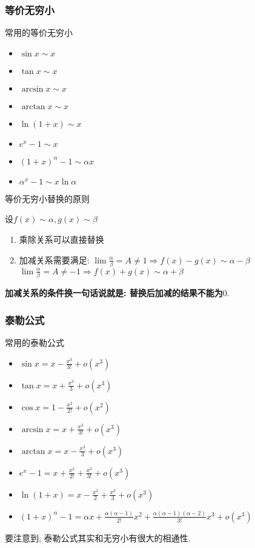 \subsubsection{等价无穷小}
{\kaishu 常用的等价无穷小}\vspace{-1em}
\begin{multicols}{2}
    \begin{itemize}
        \item $ \sin x\sim x $
        \item $ \tan x\sim x $
        \item $ \arcsin x\sim x $
        \item $ \arctan x\sim x $
        \item $ \ln(1+x)\sim x $
        \item $ e^{x}-1\sim x $
        \item $ (1+x)^{\alpha}-1\sim \alpha x $
        \item $ \alpha^{x}-1\sim x\ln \alpha $
    \end{itemize}
\end{multicols}
{\kaishu 等价无穷小替换的原则}\par \vspace{.5em}
设$ f(x)\sim \alpha, g(x)\sim \beta $
\begin{enumerate}
    \item 乘除关系可以直接替换
    \item 加减关系需要满足:
          \subitem $ \lim\limits \frac{\alpha}{\beta}=A\neq 1\Rightarrow f(x)-g(x)\sim \alpha-\beta $
          \subitem $ \lim\limits \frac{\alpha}{\beta}=A\neq -1\Rightarrow f(x)+g(x)\sim \alpha+\beta $
\end{enumerate}\par
\textbf{加减关系的条件换一句话说就是: 替换后加减的结果不能为$ 0 $}.
\subsubsection{泰勒公式}
{\kaishu 常用的泰勒公式}\vspace{-1em}
\begin{multicols}{2}
    \begin{itemize}
        \item $ \sin x=x-\frac{x^{3}}{3!}+o(x^{3}) $
        \item $ \tan x=x+\frac{x^{3}}{3}+o(x^{3}) $
        \item $ \cos x=1-\frac{x^{2}}{2!}+o(x^{2}) $
        \item $ \arcsin x=x+\frac{x^{3}}{3!}+o(x^{3}) $
        \item $ \arctan x=x-\frac{x^{3}}{3}+o(x^{3}) $
        \item $ e^{x}-1=x+\frac{x^{2}}{2!}+\frac{x^{3}}{3!}+o(x^{3}) $
        \item $ \ln(1+x)=x-\frac{x^{2}}{2}+\frac{x^{3}}{3}+o(x^{3}) $
        \item $ (1+x)^{\alpha}-1=\alpha x+\frac{\alpha(\alpha-1)}{2!}x^{2}+\frac{\alpha(\alpha-1)(\alpha-2)}{3!}x^{3}+o(x^{3}) $
    \end{itemize}
\end{multicols}\par
要注意到, 泰勒公式其实和无穷小有很大的相通性.
